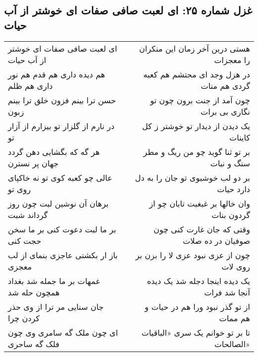 \begin{center}
\section*{غزل شماره ۲۵: ای لعبت صافی صفات ای خوشتر از آب حیات}
\label{sec:025}
\begin{longtable}{l p{0.5cm} r}
ای لعبت صافی صفات ای خوشتر از آب حیات
&&
هستی درین آخر زمان این منکران را معجزات
\\
هم دیده داری هم قدم هم نور داری هم ظلم
&&
در هزل وجد ای محتشم هم کعبه گردی هم منات
\\
حسن ترا بینم فزون خلق ترا بینم زبون
&&
چون آمد از جنت برون چون تو نگاری بی برات
\\
در نارم از گلزار تو بیزارم از آزار تو
&&
یک دیدن از دیدار تو خوشتر ز کل کاینات
\\
هر گه که بگشایی دهن گردد جهان پر نسترن
&&
بر تو ثنا گوید چو من ریگ و مطر سنگ و نبات
\\
عالی چو کعبه کوی تو نه خاکپای روی تو
&&
بر دو لب خوشبوی تو جان را به دل دارد حیات
\\
برهان آن نوشین لبت چون روز گرداند شبت
&&
وان خالها بر غبغبت تابان چو از گردون بنات
\\
بر ما لبت دعوت کنی بر ما سخن حجت کنی
&&
وقتی که جان غارت کنی چون صوفیان در ده صلات
\\
باز ار بکشتی عاجزی بنمای از لب معجزی
&&
چون از عزی نبود عزی لا را بزن بر روی لات
\\
غمهات بر ما جمله شد بغداد همچون حله شد
&&
یک دیده اینجا دجله شد یک دیده آنجا شد فرات
\\
جان سنایی مر ترا از وی حذر کردن چرا
&&
از تو گذر نبود ورا هم در حیات و هم ممات
\\
ای چون ملک گه سامری وی چون فلک گه ساحری
&&
تا بر تو خوانم یک سری «الباقیات الصالحات»
\\
\end{longtable}
\end{center}
